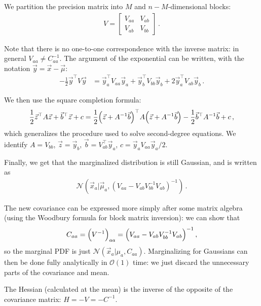 \documentclass[main.tex]{subfiles}
\begin{document}
We partition the precision matrix into \(M\) and \(n-M\)-dimensional blocks: 
%
\begin{align}
V = \left[\begin{array}{cc}
V_{aa} & V_{ab} \\ 
V_{ab} & V_{bb}
\end{array}\right]
\,.
\end{align}

Note that there is no one-to-one correspondence with the inverse matrix: in general \(V_{aa} \neq C^{-1}_{aa}\).
The argument of the exponential can be written, with the notation \(\vec{y} = \vec{x} - \vec{\mu}\):
%
\begin{align}
- \frac{1}{2} \vec{y}^{\top} V \vec{y} &= 
\vec{y}_a^{\top} V_{aa} \vec{y}_a + 
\vec{y}_b^{\top} V_{bb} \vec{y}_b + 
2\vec{y}_a^{\top} V_{ab} \vec{y}_b 
\,.
\end{align}

We then use the square completion formula: 
%
\begin{align}
\frac{1}{2} \vec{z}^{\top} A \vec{z} + \vec{b}^{\top} \vec{z} + c 
= \frac{1}{2} \qty(\vec{z} + A^{-1} \vec{b})^{\top} A \qty(\vec{z} + A^{-1} \vec{b}) - \frac{1}{2} \vec{b}^{\top} A^{-1} \vec{b} + c
\,,
\end{align}
%
which generalizes the procedure used to solve second-degree equations. 
We identify \(A = V_{bb}\), \(\vec{z} = \vec{y}_b\), \(\vec{b} = V_{ab}^{\top} \vec{y}_a\),  \(c = \vec{y}_a V_{aa} \vec{y}_a / 2\). 


Finally, we get that the marginalized distribution is still Gaussian, and is written as
%
\begin{align}
\mathcal{N}(\vec{x}_a | \vec{\mu}_a, (V_{aa} - V_{ab} V_{bb}^{-1} V_{ab})^{-1})
\,.
\end{align}

The new covariance can be expressed more simply after some matrix algebra (using the Woodbury formula for block matrix inversion): 
we can show that 
%
\begin{align}
C_{aa} = \qty(V^{-1})_{aa} = \qty(V_{aa} - V_{ab} V_{bb}^{-1} V_{ab})^{-1}
\,,
\end{align}
%
so the marginal PDF is just \(\mathcal{N}(\vec{x}_a| \mu_a, C_{aa})\).
Marginalizing for Gaussians can then be done fully analytically in \(\mathcal{O}(1)\) time: we just discard the unnecessary parts of the covariance and mean. 

The Hessian (calculated at the mean) is the inverse of the opposite of the covariance matrix: \(H = - V = - C^{-1}\). 
\end{document}
